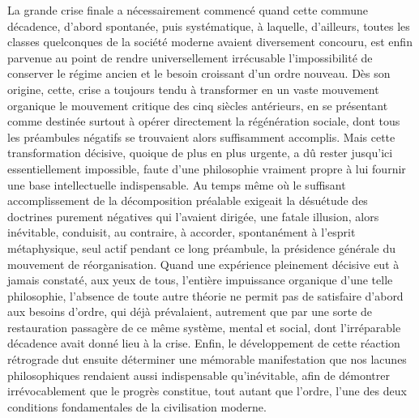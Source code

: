 \documentclass[french,twoside]{book} %
\begin{document}
La grande crise finale a nécessairement commencé quand cette commune décadence, d’abord spontanée, puis systématique, à laquelle, d’ailleurs, toutes les classes quelconques de la société moderne avaient diversement concouru, est enfin parvenue au point de rendre universellement irrécusable l’impossibilité de conserver le régime ancien et le besoin croissant d’un ordre nouveau. Dès son origine, cette, crise a toujours tendu à transformer en un vaste mouvement organique le mouvement critique des cinq siècles antérieurs, en se présentant comme destinée surtout à opérer directement la régénération sociale, dont tous les préambules négatifs se trouvaient alors suffisamment accomplis. Mais cette transformation décisive, quoique de plus en plus urgente, a dû rester jusqu’ici essentiellement impossible, faute d’une philosophie vraiment propre à lui fournir une base intellectuelle indispensable. Au temps même où le suffisant accomplissement de la décomposition préalable exigeait la désuétude des doctrines purement négatives qui l’avaient dirigée, une fatale illusion, alors inévitable, conduisit, au contraire, à accorder, spontanément à l’esprit métaphysique, seul actif pendant ce long préambule, la présidence générale du mouvement de réorganisation. Quand une expérience pleinement décisive eut à jamais constaté, aux yeux de tous, l’entière impuissance organique d’une telle philosophie, l’absence de toute autre théorie ne permit pas de satisfaire d’abord aux besoins d’ordre, qui déjà prévalaient, autrement que par une sorte de restauration passagère de ce même système, mental et social, dont l’irréparable décadence avait donné lieu à la crise. Enfin, le développement de cette réaction rétrograde dut ensuite déterminer une mémorable manifestation que nos lacunes philosophiques rendaient aussi indispensable qu’inévitable, afin de démontrer irrévocablement que le progrès constitue, tout autant que l’ordre, l’une des deux conditions fondamentales de la civilisation moderne.\par
\end{document}
